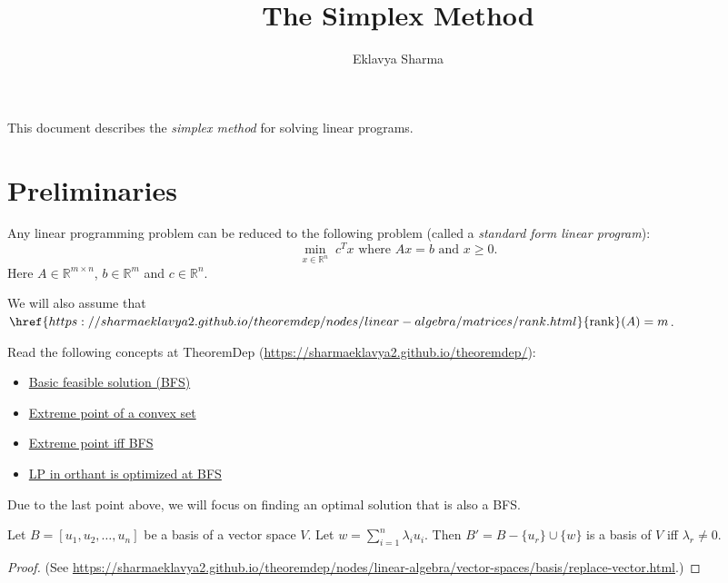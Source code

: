 \documentclass[a4paper, 12pt, fleqn]{article}
\author{Eklavya Sharma}
\date{\empty}
\title{The Simplex Method}
\newcommand*{\thmdepUrl}{https://sharmaeklavya2.github.io/theoremdep/nodes}
\newenvironment*{tightemize}{\begin{itemize}[noitemsep,topsep=0pt]}{\end{itemize}}
\DeclareMathOperator{\rank}{rank}
\newenvironment*{inLongVersion}{}{}
\newenvironment*{longProof}{\begin{proof}}{\end{proof}}
\begin{document}
\maketitle
\setlength{\parskip}{0.4em}

This document describes the \emph{simplex method} for solving linear programs.

\section{Preliminaries}

\begin{theorem}
Any linear programming problem can be reduced to the following problem
(called a \emph{standard form linear program}):
\[ \min_{x \in \mathbb{R}^n}\; c^Tx \textrm{ where } Ax = b \textrm{ and } x \ge 0. \]
Here $A \in \mathbb{R}^{m \times n}$, $b \in \mathbb{R}^m$ and $c \in \mathbb{R}^n$.
\end{theorem}

We will also assume \wLoG{} that
$\href{https://sharmaeklavya2.github.io/theoremdep/nodes/linear-algebra/matrices/rank.html}{\rank}(A) = m$.

\begin{inLongVersion}
Read the following concepts at TheoremDep (\url{https://sharmaeklavya2.github.io/theoremdep/}):
\begin{tightemize}
\item \href{\thmdepUrl/convexity/polyhedra/bfs.html}{Basic feasible solution (BFS)}
\item \href{\thmdepUrl/convexity/extreme-point.html}{Extreme point of a convex set}
\item \href{\thmdepUrl/convexity/polyhedra/extreme-point-iff-bfs.html}{Extreme point iff BFS}
\item \href{\thmdepUrl/convexity/polyhedra/orth-lp.html}{LP in orthant is optimized at BFS}
\end{tightemize}
Due to the last point above, we will focus on finding an optimal solution that is also a BFS.
\end{inLongVersion}

\begin{lemma}
\label{thm:replace-vector-in-basis}
Let $B = [u_1, u_2, \ldots, u_n]$ be a basis of a vector space $V$.
Let $w = \sum_{i=1}^n \lambda_i u_i$.
Then $B' = B - \{u_r\} \cup \{w\}$ is a basis of $V$ iff $\lambda_r \neq 0$.
\end{lemma}
\begin{longProof}
(See \url{\thmdepUrl/linear-algebra/vector-spaces/basis/replace-vector.html}.)
\end{longProof}
\end{document}
